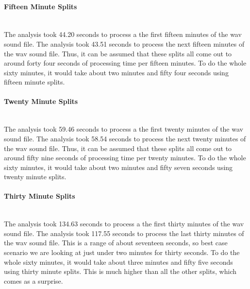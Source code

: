 \paragraph{Fifteen Minute Splits} \mbox{}\\[\paragraphheaderspace]
The analysis took 44.20 seconds to process a the first fifteen minutes of the wav sound file. The analysis took 43.51 seconds to process the next fifteen minutes of the wav sound file. Thus, it can be assumed that these splits all come out to around forty four seconds of processing time per fifteen minutes. To do the whole sixty minutes, it would take about two minutes and fifty four seconds using fifteen minute splits.

\paragraph{Twenty Minute Splits} \mbox{}\\[\paragraphheaderspace]
The analysis took 59.46 seconds to process a the first twenty minutes of the wav sound file. The analysis took 58.54 seconds to process the next twenty minutes of the wav sound file. Thus, it can be assumed that these splits all come out to around fifty nine seconds of processing time per twenty minutes. To do the whole sixty minutes, it would take about two minutes and fifty seven seconds using twenty minute splits.

\paragraph{Thirty Minute Splits} \mbox{}\\[\paragraphheaderspace]
The analysis took 134.63 seconds to process a the first thirty minutes of the wav sound file. The analysis took 117.55 seconds to process the last thirty minutes of the wav sound file. This is a range of about seventeen seconds, so best case scenario we are looking at just under two minutes for thirty seconds. To do the whole sixty minutes, it would take about three minutes and fifty five seconds using thirty minute splits. This is much higher than all the other splits, which comes as a surprise.
